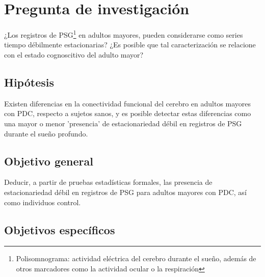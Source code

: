 

\section{Pregunta de investigación}

¿Los registros de PSG\footnote{Polisomnograma: actividad eléctrica del cerebro durante el sueño,
además de otros marcadores como la actividad ocular o la respiración} en adultos mayores, pueden
considerarse como series tiempo débilmente estacionarias?
¿Es posible que tal caracterización se relacione con el estado cognoscitivo del adulto mayor?


\subsection{Hipótesis}

Existen diferencias en la conectividad funcional del cerebro en adultos mayores con PDC, respecto
a sujetos sanos, y es posible detectar estas diferencias como una mayor o menor 'presencia' de 
estacionariedad débil en registros de PSG durante el sueño profundo.


\subsection{Objetivo general}

Deducir, a partir de pruebas estadísticas formales, las presencia de estacionariedad débil en
registros de PSG para adultos mayores con PDC, así como individuos control.


\subsection{Objetivos específicos}


